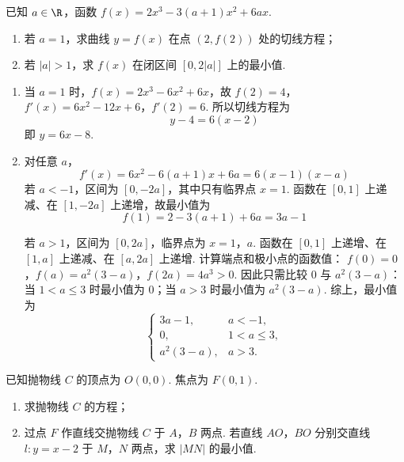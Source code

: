 \begin{problem}
已知 \(a \in \R\)，函数 \(f(x) = 2x^3 - 3(a + 1)x^2 + 6ax\).
\begin{enumerate}
\item 若 \(a = 1\)，求曲线 \(y = f(x)\) 在点 \((2, f(2))\) 处的切线方程；
\item 若 \( |a| > 1 \)，求 \( f(x) \) 在闭区间 \([0, 2|a|]\) 上的最小值.
\end{enumerate}
\end{problem}

\begin{solution}
\begin{enumerate}
\item 当 \(a=1\) 时，\(f(x)=2x^3-6x^2+6x\)，故
\(f(2)=4\)，\(f'(x)=6x^2-12x+6\)，\(f'(2)=6\).
所以切线方程为
\[
y-4=6(x-2)
\]
即 \(y=6x-8\).

\item 对任意 \(a\)，
\[
f'(x)=6x^2-6(a+1)x+6a=6(x-1)(x-a)
\]
若 \(a<-1\)，区间为 \([0,-2a]\)，其中只有临界点 \(x=1\). 函数在 \([0,1]\) 上递减、在 \([1,-2a]\) 上递增，故最小值为
\[
f(1)=2-3(a+1)+6a=3a-1
\]

若 \(a>1\)，区间为 \([0,2a]\)，临界点为 \(x=1\)，\(a\). 函数在 \([0,1]\) 上递增、在 \([1,a]\) 上递减、在 \([a,2a]\) 上递增. 计算端点和极小点的函数值：
\(f(0)=0\)，\(f(a)=a^2(3-a)\)，\(f(2a)=4a^3>0\).
因此只需比较 \(0\) 与 \(a^2(3-a)\)：当 \(1<a\leqslant3\) 时最小值为 \(0\)；当 \(a>3\) 时最小值为 \(a^2(3-a)\). 综上，最小值为
\[
\begin{cases}
3a-1, & a<-1,\\
0, & 1<a\leqslant3,\\
a^2(3-a), & a>3.
\end{cases}
\]
\end{enumerate}
\end{solution}

\begin{problem}
已知抛物线 \(C\) 的顶点为 \(O(0,0)\). 焦点为 \(F(0,1)\).
\begin{enumerate}
\item 求抛物线 \(C\) 的方程；
\item 过点 \(F\) 作直线交抛物线 \(C\) 于 \(A\)，\(B\) 两点. 若直线 \(AO\)，\(BO\) 分别交直线 \(l: y = x - 2\) 于 \(M\)，\(N\) 两点，求 \(|MN|\) 的最小值.
\end{enumerate}
\end{problem}

